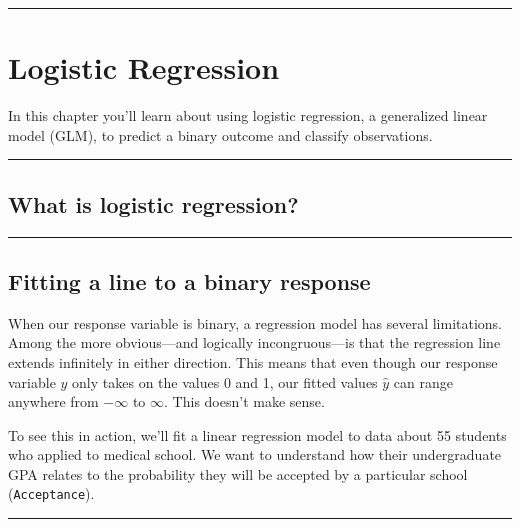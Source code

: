 \documentclass[
]{book}
\begin{document}
\begin{center}\rule{0.5\linewidth}{0.5pt}\end{center}

\hypertarget{logistic-regression}{%
\chapter{Logistic Regression}\label{logistic-regression}}

In this chapter you'll learn about using logistic regression, a generalized linear model (GLM), to predict a binary outcome and classify observations.

\begin{center}\rule{0.5\linewidth}{0.5pt}\end{center}

\hypertarget{what-is-logistic-regression}{%
\section*{What is logistic regression?}\label{what-is-logistic-regression}}

\begin{center}\rule{0.5\linewidth}{0.5pt}\end{center}

\hypertarget{fitting-a-line-to-a-binary-response}{%
\section{Fitting a line to a binary response}\label{fitting-a-line-to-a-binary-response}}

When our response variable is binary, a regression model has several limitations. Among the more obvious---and logically incongruous---is that the regression line extends infinitely in either direction. This means that even though our response variable \(y\) only takes on the values 0 and 1, our fitted values \(\hat{y}\) can range anywhere from \(-\infty\) to \(\infty\). This doesn't make sense.

To see this in action, we'll fit a linear regression model to data about 55 students who applied to medical school. We want to understand how their undergraduate GPA relates to the probability they will be accepted by a particular school (\texttt{Acceptance}).

\begin{center}\rule{0.5\linewidth}{0.5pt}\end{center}
\end{document}
